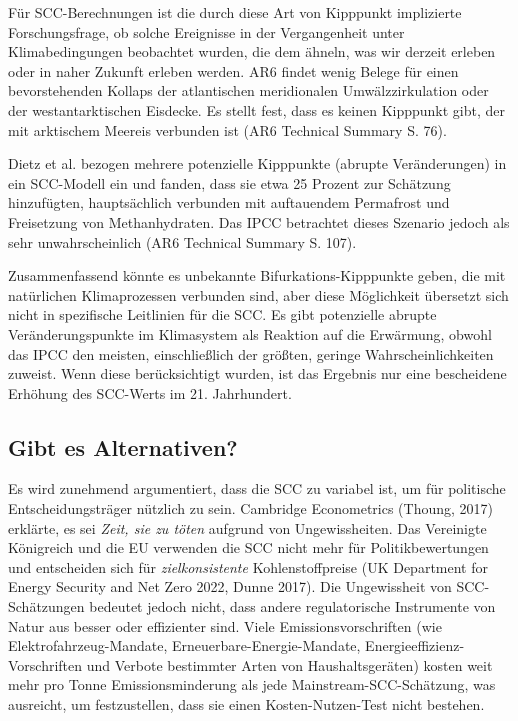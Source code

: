 \documentclass[12pt,paper=a4,DIV=12,parskip=never,chapterprefix=false,headings=standardclasses]{scrreprt}
\begin{document}
Für SCC-Berechnungen ist die durch diese Art von Kipppunkt implizierte Forschungsfrage, ob solche Ereignisse in der Vergangenheit unter Klimabedingungen beobachtet wurden, die dem ähneln, was wir derzeit erleben oder in naher Zukunft erleben werden. AR6 findet wenig Belege für einen bevorstehenden Kollaps der atlantischen meridionalen Umwälzzirkulation oder der westantarktischen Eisdecke. Es stellt fest, dass es keinen Kipppunkt gibt, der mit arktischem Meereis verbunden ist (AR6 Technical Summary S. 76).

Dietz et al. bezogen mehrere potenzielle Kipppunkte (abrupte Veränderungen) in ein SCC-Modell ein und fanden, dass sie etwa 25 Prozent zur Schätzung hinzufügten, hauptsächlich verbunden mit auftauendem Permafrost und Freisetzung von Methanhydraten. Das IPCC betrachtet dieses Szenario jedoch als sehr unwahrscheinlich (AR6 Technical Summary S. 107).

Zusammenfassend könnte es unbekannte Bifurkations-Kipppunkte geben, die mit natürlichen Klimaprozessen verbunden sind, aber diese Möglichkeit übersetzt sich nicht in spezifische Leitlinien für die SCC. Es gibt potenzielle abrupte Veränderungspunkte im Klimasystem als Reaktion auf die Erwärmung, obwohl das IPCC den meisten, einschließlich der größten, geringe Wahrscheinlichkeiten zuweist. Wenn diese berücksichtigt wurden, ist das Ergebnis nur eine bescheidene Erhöhung des SCC-Werts im 21. Jahrhundert.

\subsection{Gibt es Alternativen?}
Es wird zunehmend argumentiert, dass die SCC zu variabel ist, um für politische Entscheidungsträger nützlich zu sein. Cambridge Econometrics (Thoung, 2017) erklärte, es sei \emph{Zeit, sie zu töten} aufgrund von Ungewissheiten. Das Vereinigte Königreich und die EU verwenden die SCC nicht mehr für Politikbewertungen und entscheiden sich für \emph{zielkonsistente} Kohlenstoffpreise (UK Department for Energy Security and Net Zero 2022, Dunne 2017). Die Ungewissheit von SCC-Schätzungen bedeutet jedoch nicht, dass andere regulatorische Instrumente von Natur aus besser oder effizienter sind. Viele Emissionsvorschriften (wie Elektrofahrzeug-Mandate, Erneuerbare-Energie-Mandate, Energieeffizienz-Vorschriften und Verbote bestimmter Arten von Haushaltsgeräten) kosten weit mehr pro Tonne Emissionsminderung als jede Mainstream-SCC-Schätzung, was ausreicht, um festzustellen, dass sie einen Kosten-Nutzen-Test nicht bestehen.
\end{document}
